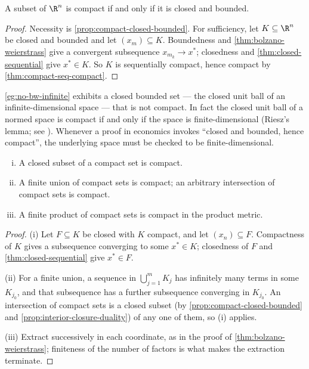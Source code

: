 \begin{theorem}\label{thm:heine-borel}
	A subset of $\R^n$ is compact if and only if it is closed and bounded.
\end{theorem}

\begin{proof}
	Necessity is \autoref{prop:compact-closed-bounded}. For sufficiency, let
	$K\subseteq\R^n$ be closed and bounded and let $(x_m)\subseteq K$. Boundedness
	and \autoref{thm:bolzano-weierstrass} give a convergent subsequence
	$x_{m_k}\to x^\ast$; closedness and \autoref{thm:closed-sequential} give
	$x^\ast\in K$. So $K$ is sequentially compact, hence compact by
	\autoref{thm:compact-seq-compact}.
\end{proof}

\begin{remark}\label{rem:heine-borel-fails}
	\autoref{eg:no-bw-infinite} exhibits a closed bounded set --- the closed unit
	ball of an infinite-dimensional space --- that is not compact. In fact the
	closed unit ball of a normed space is compact if and only if the space is
	finite-dimensional (Riesz's lemma; see
	\textcite[Ch.~5]{aliprantis2006infinite}). Whenever a proof in economics invokes
	``closed and bounded, hence compact'', the underlying space must be checked to
	be finite-dimensional.
\end{remark}

\begin{proposition}\label{prop:compact-stability}
	\begin{enumerate}[(i)]
		\item A closed subset of a compact set is compact.
		\item A finite union of compact sets is compact; an arbitrary intersection of
		      compact sets is compact.
		\item A finite product of compact sets is compact in the product metric.
	\end{enumerate}
\end{proposition}

\begin{proof}
	(i) Let $F\subseteq K$ be closed with $K$ compact, and let $(x_n)\subseteq F$.
	Compactness of $K$ gives a subsequence converging to some $x^\ast\in K$;
	closedness of $F$ and \autoref{thm:closed-sequential} give $x^\ast\in F$.

	(ii) For a finite union, a sequence in $\bigcup_{j=1}^mK_j$ has infinitely many
	terms in some $K_{j_0}$, and that subsequence has a further subsequence
	converging in $K_{j_0}$. An intersection of compact sets is a closed subset
	(by \autoref{prop:compact-closed-bounded} and
	\autoref{prop:interior-closure-duality}) of any one of them, so (i) applies.

	(iii) Extract successively in each coordinate, as in the proof of
	\autoref{thm:bolzano-weierstrass}; finiteness of the number of factors is what
	makes the extraction terminate.
\end{proof}

